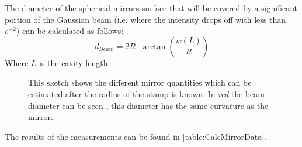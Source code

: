 The diameter of the spherical mirrors surface that will be covered by a significant portion of the Gaussian beam (i.e. where the intensity drops off with less than $e^{-2}$) can be calculated as follows:
\begin{equation}
	d_{\si{Beam}}=2R\cdot \arctan\left(\frac{w(L)}{R}\right)
\end{equation}
Where $L$ is the cavity length.
\begin{figure}[H]
	
	\caption{This sketch shows the different mirror quantities which can be estimated after the radius of the stamp is known. In \textit{red} the beam diameter can be seen , this diameter has the same curvature as the mirror.}
\end{figure}
The results of the measurements can be found in \autoref{table:CalcMirrorData}.

